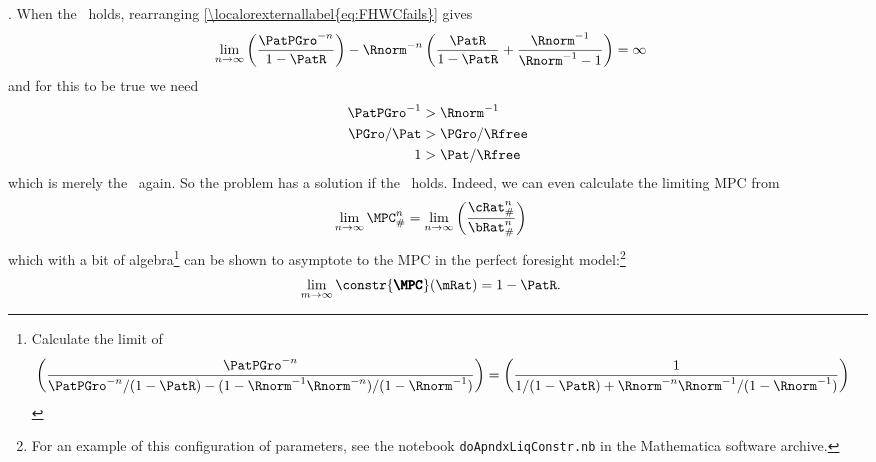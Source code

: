 \documentclass[\econtexRoot/BufferStockTheory]{subfiles}
\begin{document}
.  When the \RIC~holds, rearranging \eqref{\localorexternallabel{eq:FHWCfails}} gives
\begin{eqnarray*}
  \lim_{n \rightarrow \infty} \left(\frac{\PatPGro^{-n}}{1-\PatR}\right)-\Rnorm^{-n}\left(\frac{\PatR}{1-\PatR}+\frac{\Rnorm^{-1}}{\Rnorm^{-1}-1}\right)  & = \infty
\end{eqnarray*}
and for this to be true we need
\begin{eqnarray*}
  \PatPGro^{-1}  & > \Rnorm^{-1}
  \\ \PGro/\Pat  & > \PGro/\Rfree
  \\ 1  & > \Pat/\Rfree
\end{eqnarray*}
which is merely the \RIC~again.  So the problem has a solution if the \RIC~holds.  Indeed,
we can even calculate the limiting MPC from
\begin{equation}\begin{gathered}\begin{aligned}
  \lim_{n \rightarrow \infty} \MPC^{n}_{\#}  & = \lim_{n \rightarrow \infty} \left(\frac{\cRat_{\#}^{n}}{\bRat_{\#}^{n}}\right) \label{eq:MPCConstrLim}
\end{aligned}\end{gathered}\end{equation}
which with a bit of algebra\footnote{
  Calculate the limit of
  \begin{equation}\begin{gathered}\begin{aligned}
    \left(\frac{\PatPGro^{-n}}{\PatPGro^{-n}/(1-\PatR) - (1-\Rnorm^{-1}\Rnorm^{-n})/(1-\Rnorm^{-1})}\right)  & = \left(\frac{1}{1/(1-\PatR) + \Rnorm^{-n}\Rnorm^{-1}/(1-\Rnorm^{-1})}\right)
  \end{aligned}\end{gathered}\end{equation}} can be shown to asymptote to the MPC in the perfect foresight model:\footnote{For an example of this configuration of parameters, see the notebook \texttt{doApndxLiqConstr.nb} in the Mathematica software  archive.}
\begin{equation}\begin{gathered}\begin{aligned}
  \lim_{m \rightarrow \infty} \constr{\pmb{\MPC}}(\mRat)  & = 1-\PatR.
\end{aligned}\end{gathered}\end{equation}
\end{document}
